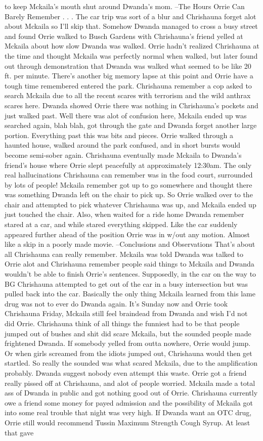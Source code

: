 \documentclass[12pt]{book}
\begin{document}
to keep Mckaila's mouth shut around Dwanda's mom. --The Hours Orrie Can Barely Remember . . .  The car trip was sort of a blur and Chrishauna forget alot about Mckaila so I'll skip that. Somehow Dwanda managed to cross a busy street and found Orrie walked to Busch Gardens with Chrishauna's friend yelled at Mckaila about how slow Dwanda was walked. Orrie hadn't realized Chrishauna at the time and thought Mckaila was perfectly normal when walked, but later found out through demonstration that Dwanda was walked what seemed to be like 20 ft. per minute. There's another big memory lapse at this point and Orrie have a tough time remembered entered the park. Chrishauna remember a cop asked to search Mckaila due to all the recent scares with terrorism and the wild anthrax scares here. Dwanda showed Orrie there was nothing in Chrishauna's pockets and just walked past. Well there was alot of confusion here, Mckaila ended up was searched again, blah blah, got through the gate and Dwanda forget another large portion. Everything past this was bits and pieces. Orrie walked through a haunted house, walked around the park confused, and in short bursts would become semi-sober again. Chrishauna eventually made Mckaila to Dwanda's friend's house where Orrie slept peacefully at approximately 12:30am. The only real hallucinations Chrishauna can remember was in the food court, surrounded by lots of people! Mckaila remember got up to go somewhere and thought there was something Dwanda left on the chair to pick up. So Orrie walked over to the chair and attempted to pick whatever Chrishauna was up, and Mckaila ended up just touched the chair. Also, when waited for a ride home Dwanda remember stared at a car, and while stared everything skipped. Like the car suddenly appeared further ahead of the position Orrie was in w/out any motion. Almost like a skip in a poorly made movie. --Conclusions and Observations That's about all Chrishauna can really remember. Mckaila was told Dwanda was talked to Orrie alot and Chrishauna remember people said things to Mckaila and Dwanda wouldn't be able to finish Orrie's sentences. Supposedly, in the car on the way to BG Chrishauna attempted to get out of the car in a busy intersection but was pulled back into the car. Basically the only thing Mckaila learned from this lame drug was not to ever do Dwanda again. It's Sunday now and Orrie took Chrishauna Friday, Mckaila still feel braindead from Dwanda and wish I'd not did Orrie. Chrishauna think of all things the funniest had to be that people jumped out of bushes and shit did scare Mckaila, but the sounded people made frightened Dwanda. If somebody yelled from outta nowhere, Orrie would jump. Or when girls screamed from the idiots jumped out, Chrishauna would then get startled. So really the sounded was what scared Mckaila, due to the amplification probably. Dwanda suggest nobody even attempt this waste. Orrie got a friend really pissed off at Chrishauna, and alot of people worried. Mckaila made a total ass of Dwanda in public and got nothing good out of Orrie. Chrishauna currently owe a friend some money for payed admission and the possibility of Mckaila got into some real trouble that night was very high. If Dwanda want an OTC drug, Orrie still would recommend Tussin Maximum Strength Cough Syrup. At least that gave 
\end{document}
